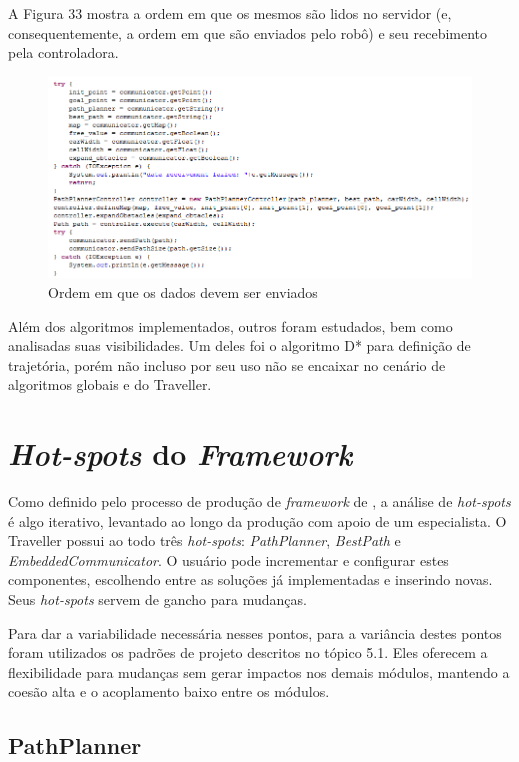 A Figura 33 mostra a ordem em que os mesmos são lidos no servidor (e, consequentemente, a ordem em que são enviados pelo robô) e seu recebimento pela controladora.

\begin{figure}[h]
	\centering
	\label{fig33}
		\includegraphics[keepaspectratio=true,scale=0.7]{figuras/main.PNG}
	\caption{Ordem em que os dados devem ser enviados}
\end{figure}

Além dos algoritmos implementados, outros foram estudados, bem como analisadas suas visibilidades. Um deles foi o algoritmo D* \cite{Ferguson__2005_5119} para definição de trajetória, porém não incluso por seu uso não se encaixar no cenário de algoritmos globais e do Traveller.

\section{\textit{Hot-spots} do \textit{Framework}}

Como definido pelo processo de produção de \textit{framework} de \cite{Fayad1999}, a análise de \textit{hot-spots} é algo iterativo, levantado ao longo da produção com apoio de um especialista. O Traveller possui ao todo três \textit{hot-spots}: \textit{PathPlanner}, \textit{BestPath} e \textit{EmbeddedCommunicator}. O usuário pode incrementar e configurar estes componentes, escolhendo entre as soluções já implementadas e inserindo novas. Seus \textit{hot-spots} servem de gancho para mudanças.

Para dar a variabilidade necessária nesses pontos, para a variância destes pontos foram utilizados os padrões de projeto descritos no tópico 5.1. Eles oferecem a flexibilidade para mudanças sem gerar impactos nos demais módulos, mantendo a coesão alta e o acoplamento baixo entre os módulos.

\subsection{PathPlanner}

